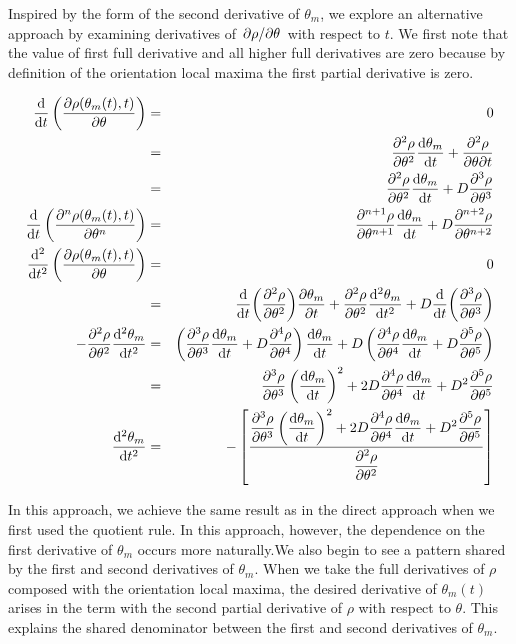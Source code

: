 \documentclass[11pt]{article} %
\begin{document}
Inspired by the form of the second derivative of $ \theta_m $, we explore an alternative approach by examining derivatives of $ \pdv*{\rho}{\theta} (\theta_m(t),t) $ with respect to $ t $. We first note that the value of first full derivative and all higher full derivatives are zero because by definition of the orientation local maxima the first partial derivative is zero.

\begin{eqnarray}
\dv{t} \left( \pdv{\rho(\theta_m(t),t)}{\theta} \right) & = & 0 \\
& = & \pdv[2]{\rho}{\theta} \dv{\theta_m}{t} + \pdv{\rho}{\theta}{t} \\
& = & \pdv[2]{\rho}{\theta} \dv{\theta_m}{t} + D \pdv[3]{\rho}{\theta} \\
\dv{t} \left( \pdv[n]{\rho(\theta_m(t),t)}{\theta} \right) & = & \pdv[n+1]{\rho}{\theta} \dv{\theta_m}{t} + D \pdv[n+2]{\rho}{\theta} \\
\dv[2]{t} \left( \pdv{\rho(\theta_m(t),t)}{\theta} \right) & = & 0 \\
& = & \dv{t}( \pdv[2]{\rho}{\theta} ) \pdv{\theta_m}{t} + \pdv[2]{\rho}{\theta} \dv[2]{\theta_m}{t} + D \dv{t}( \pdv[3]{\rho}{\theta} ) \\
-  \pdv[2]{\rho}{\theta} \dv[2]{\theta_m}{t}  & = &
 \left( \pdv[3]{\rho}{\theta} \dv{\theta_m}{t} + D \pdv[4]{\rho}{\theta} \right) \dv{\theta_m}{t}
+ D\left( \pdv[4]{\rho}{\theta} \dv{\theta_m}{t} + D \pdv[5]{\rho}{\theta} \right) \\ 
 & = &  \pdv[3]{\rho}{\theta} \left( \dv{\theta_m}{t} \right)^2 + 2 D \pdv[4]{\rho}{\theta}  \dv{\theta_m}{t}  + D^2 \pdv[5]{\rho}{\theta}  \\
\dv[2]{\theta_m}{t} & = & - \left[ \frac{\displaystyle
\pdv[3]{\rho}{\theta} \left( \dv{\theta_m}{t} \right)^2
+ 2D \pdv[4]{\rho}{\theta} \dv{\theta_m}{t}
+ D^2 \pdv[5]{\rho}{\theta}
}{ \displaystyle \pdv[2]{\rho}{\theta} } \right]
\end{eqnarray}

In this approach, we achieve the same result as in the direct approach when we first used the quotient rule. In this approach, however, the dependence on the first derivative of $ \theta_m $ occurs more naturally.We also begin to see a pattern shared by the first and second derivatives of $ \theta_m $. When we take the full derivatives of $ \rho $ composed with the orientation local maxima, the desired derivative of $ \theta_m(t) $  arises in the term with the second partial derivative of $ \rho $ with respect to $ \theta $. This explains the shared denominator between the first and second derivatives of $ \theta_m $.
\end{document}
